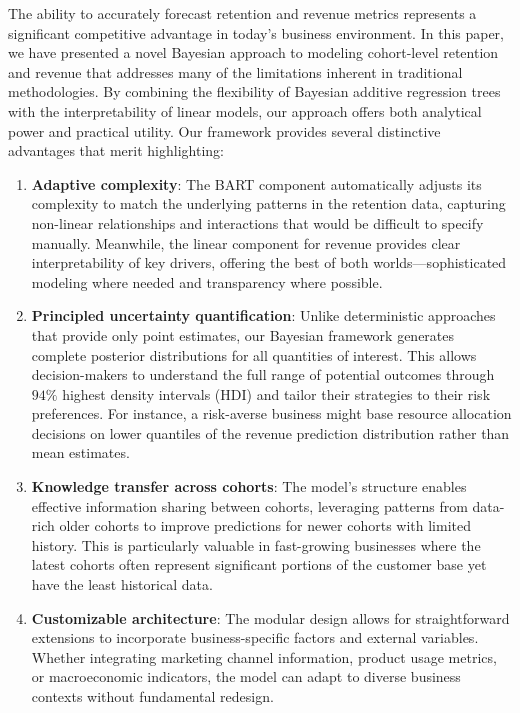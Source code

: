 \documentclass[11pt]{amsart}
\theoremstyle{definition}
\begin{document}
The ability to accurately forecast retention and revenue metrics represents a significant competitive advantage in today's
business environment. In this paper, we have presented a novel Bayesian approach to modeling cohort-level retention and
revenue that addresses many of the limitations inherent in traditional methodologies. By combining the flexibility of
Bayesian additive regression trees with the interpretability of linear models, our approach offers both analytical power and
practical utility. Our framework provides several distinctive advantages that merit highlighting:

\begin{enumerate}
    \item \textbf{Adaptive complexity}: The BART component automatically adjusts its complexity to match the underlying
          patterns in the retention data, capturing non-linear relationships and interactions that would be difficult to
          specify manually. Meanwhile, the linear component for revenue provides clear interpretability of key drivers,
          offering the best of both worlds—sophisticated modeling where needed and transparency where possible.

    \item \textbf{Principled uncertainty quantification}: Unlike deterministic approaches that provide only point estimates,
          our Bayesian framework generates complete posterior distributions for all quantities of interest. This allows
          decision-makers to understand the full range of potential outcomes through $94\%$ highest density intervals (HDI) and
          tailor their strategies to their risk preferences. For instance, a risk-averse business might base resource
          allocation decisions on lower quantiles of the revenue prediction distribution rather than mean estimates.

    \item \textbf{Knowledge transfer across cohorts}: The model's structure enables effective information sharing between
          cohorts, leveraging patterns from data-rich older cohorts to improve predictions for newer cohorts with limited
          history. This is particularly valuable in fast-growing businesses where the latest cohorts often represent
          significant portions of the customer base yet have the least historical data.

    \item \textbf{Customizable architecture}: The modular design allows for straightforward extensions to incorporate
          business-specific factors and external variables. Whether integrating marketing channel information, product usage
          metrics, or macroeconomic indicators, the model can adapt to diverse business contexts without fundamental redesign.
\end{enumerate}
\end{document}
